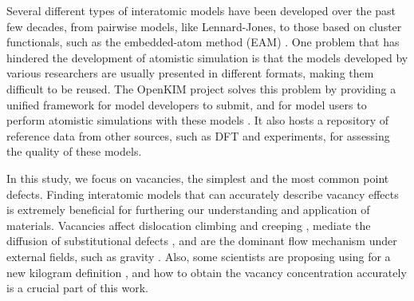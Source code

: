 \documentclass[%
 reprint,
 amsmath,amssymb,
 aps,
]{revtex4-1}
\begin{document}
Several different types of interatomic models have been developed over the past few decades, from pairwise models, like Lennard-Jones, to those based on cluster functionals, such as the embedded-atom method (EAM) \cite{daw1993embedded, daw1984embedded}.
One problem that has hindered the development of atomistic simulation is that the models developed by various researchers are usually presented in different formats, making them difficult to be reused.
The OpenKIM project \cite{bierbaum2014openkim, openkim2016} solves this problem by providing a unified framework for model developers to submit, and for model users to perform atomistic simulations with these models \cite{tadmor2011potential}.
It also hosts a repository of reference data from other sources, such as DFT and experiments, for assessing the quality of these models.

In this study, we focus on vacancies, the simplest and the most common point defects.
Finding interatomic models that can accurately describe vacancy effects is extremely beneficial for furthering our understanding and application of materials.
Vacancies affect dislocation climbing and creeping \cite{weertman1955theory}, mediate the diffusion of substitutional defects \cite{fahey1989point}, and are the dominant flow mechanism under external fields, such as gravity \cite{sethna2014flow}.
Also, some scientists are proposing using  for a new kilogram definition \cite{andreas2011counting}, and how to obtain the vacancy concentration accurately is a crucial part of this work.
\end{document}
